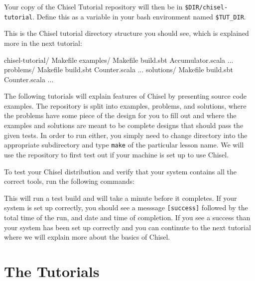 
\noindent
Your copy of the Chisel Tutorial repository will then be in \verb+$DIR/chisel-tutorial+.  Define this as a variable in your bash environment named \verb+$TUT_DIR+.

This is the Chisel tutorial directory structure you should see, which is explained more in the next tutorial:

\begin{bash}
chisel-tutorial/  
  Makefile
  examples/
    Makefile
    build.sbt
    Accumulator.scala ...
  problems/
    Makefile
    build.sbt
    Counter.scala ...
  solutions/
    Makefile
    build.sbt
    Counter.scala ...
\end{bash}

\noindent 

The following tutorials will explain features of Chisel by presenting source code examples.  The repository is split into examples, problems, and solutions, where the problems have some piece of the design for you to fill out and where the examples and solutions are meant to be complete designs that should pass the given tests.  In order to run either, you simply need to change directory into the appropriate subdirectory and type \verb+make+ of the particular lesson name. We will use the repository to first test out if your machine is set up to use Chisel.

To test your Chisel distribution and verify that your system contains all the correct tools, run the following commands:


This will run a test build and will take a minute before it completes. If your system is set up correctly, you should see a messsage \verb+[success]+ followed by the total time of the run, and date and time of completion. If you see a success than your system has been set up correctly and you can continute to the next tutorial where we will explain more about the basics of Chisel.

\section{The Tutorials}

